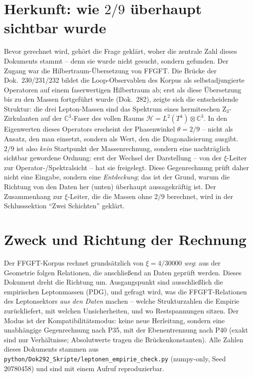\section{Herkunft: wie $2/9$ überhaupt sichtbar wurde}
Bevor gerechnet wird, gehört die Frage geklärt, woher die zentrale Zahl
dieses Dokuments stammt -- denn sie wurde nicht gesucht, sondern gefunden.
Der Zugang war die Hilbertraum-Übersetzung von FFGFT. Die Brücke der
Dok.~230/231/232 bildet die Loop-Observablen des Korpus als
selbstadjungierte Operatoren auf einem faserwertigen Hilbertraum ab; erst als
diese Übersetzung bis zu den Massen fortgeführt wurde (Dok.~282), zeigte sich
die entscheidende Struktur: die drei Lepton-Massen sind das Spektrum eines
hermiteschen Z$_3$-Zirkulanten auf der $\mathbb{C}^3$-Faser des vollen Raums
$\mathcal{H}=L^2(T^4)\otimes\mathbb{C}^3$. In den Eigenwerten dieses
Operators erscheint der Phasenwinkel $\theta=2/9$ -- nicht als Ansatz, den
man einsetzt, sondern als Wert, den die Diagonalisierung ausgibt. $2/9$ ist
also \emph{kein} Startpunkt der Massenrechnung, sondern eine nachträglich
sichtbar gewordene Ordnung: erst der Wechsel der Darstellung -- von der
$\xi$-Leiter zur Operator-/Spektralsicht -- hat sie freigelegt. Diese
Gegenrechnung prüft daher nicht eine Eingabe, sondern eine \emph{Entdeckung};
das ist der Grund, warum die Richtung von den Daten her (unten) überhaupt
aussagekräftig ist. Der Zusammenhang zur $\xi$-Leiter, die die Massen ohne
$2/9$ berechnet, wird in der Schlusssektion \enquote{Zwei Schichten} geklärt.

\section{Zweck und Richtung der Rechnung}
Der FFGFT-Korpus rechnet grundsätzlich von $\xi=4/30000$ \emph{weg}: aus der
Geometrie folgen Relationen, die anschließend an Daten geprüft werden. Dieses
Dokument dreht die Richtung um. Ausgangspunkt sind ausschließlich die
empirischen Leptonmassen (PDG), und gefragt wird, was die FFGFT-Relationen
des Leptonsektors \emph{aus den Daten} machen -- welche Strukturzahlen die
Empirie zurückliefert, mit welchen Unsicherheiten, und wo Restspannungen
sitzen. Der Modus ist der Kompatibilitätsmodus: keine neue Herleitung, sondern
eine unabhängige Gegenrechnung nach P35, mit der Ebenentrennung nach P40
(exakt sind nur Verhältnisse; Absolutwerte tragen die Brückenkonstanten).
Alle Zahlen dieses Dokuments stammen aus
\texttt{python/Dok292\_Skripte/leptonen\_empirie\_check.py} (numpy-only, Seed
20780458) und sind mit einem Aufruf reproduzierbar.

